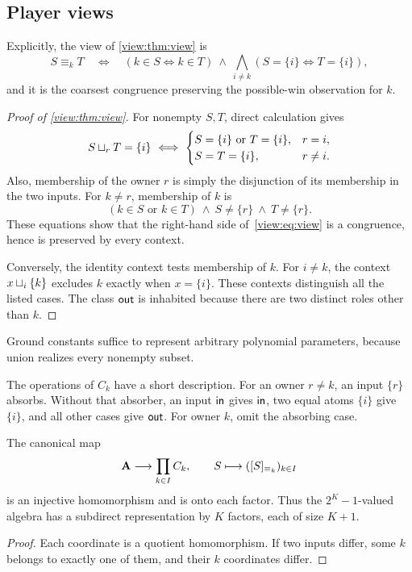\subsection{Player views}\label{app:proofs-views}

Explicitly, the view of \cref{view:thm:view} is
\begin{equation}\label{view:eq:view}
 S\equiv_k T\quad\Longleftrightarrow\quad
 (k\in S\Longleftrightarrow k\in T)
 \ \land\ \bigwedge_{i\ne k}(S=\{i\}\Longleftrightarrow T=\{i\}),
\end{equation}
and it is the coarsest congruence preserving the possible-win observation for $k$.

\begin{proof}[Proof of \cref{view:thm:view}]
For nonempty $S,T$, direct calculation gives
\[
 S\ow r T=\{i\}\ \Longleftrightarrow\
 \begin{cases}
 S=\{i\}\text{ or }T=\{i\},&r=i,\\
 S=T=\{i\},&r\ne i.
 \end{cases}
\]
Also, membership of the owner $r$ is simply the disjunction of its
membership in the two inputs. For $k\ne r$, membership of $k$ is
\[
 (k\in S\text{ or }k\in T)\ \land\ S\ne\{r\}\ \land\ T\ne\{r\}.
\]
These equations show that the right-hand side of~\eqref{view:eq:view} is a
congruence, hence is preserved by every context.

Conversely, the identity context tests membership of $k$. For $i\ne k$,
the context $x\mathbin{\sqcup_{i}}\{k\}$ excludes $k$ exactly when $x=\{i\}$. These
contexts distinguish all the listed cases. The class $\mathsf{out}$ is inhabited
because there are two distinct roles other than $k$.
\end{proof}

Ground constants suffice to represent arbitrary polynomial parameters, because union realizes every nonempty subset.

The operations of $C_k$ have a short description. For an owner $r\ne k$, an input $\{r\}$ absorbs. Without that absorber, an input $\mathsf{in}$ gives $\mathsf{in}$, two equal atoms $\{i\}$ give $\{i\}$, and all other cases give $\mathsf{out}$. For owner $k$, omit the absorbing case.

\begin{corollary}\label{view:cor:product}
The canonical map
\[
 \mathbf A\longrightarrow\prod_{k\in I} C_k,\qquad
 S\longmapsto([S]_{\equiv_k})_{k\in I}
\]
is an injective homomorphism and is onto each factor. Thus the
$2^K-1$-valued algebra has a subdirect representation by $K$ factors,
each of size $K+1$.
\end{corollary}
\begin{proof}
Each coordinate is a quotient homomorphism. If two inputs differ, some
$k$ belongs to exactly one of them, and their $k$ coordinates differ.
\end{proof}

